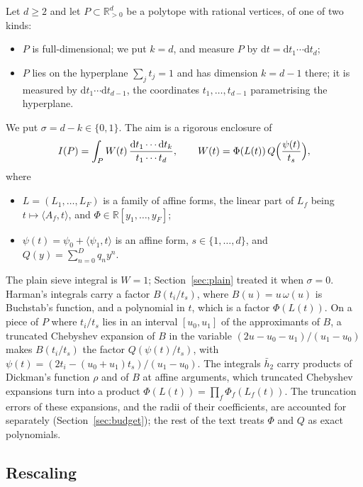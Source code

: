 \documentclass[11pt]{article}
\theoremstyle{remark}
\newcommand{\R}{\mathbb{R}}
\newcommand{\scal}[2]{\langle #1, #2\rangle}
\newcommand{\dd}{\mathrm{d}}
\begin{document}
Let $d \geq 2$ and let $P \subset \R_{>0}^d$ be a polytope with rational
vertices, of one of two kinds:
\begin{itemize}
\item $P$ is full-dimensional; we put $k = d$, and measure $P$ by
  $\dd t = \dd t_1 \cdots \dd t_d$;
\item $P$ lies on the hyperplane $\sum_j t_j = 1$ and has dimension
  $k = d - 1$ there; it is measured by $\dd t_1 \cdots \dd t_{d-1}$, the
  coordinates $t_1, \ldots, t_{d-1}$ parametrising the hyperplane.
\end{itemize}
We put $\sigma = d - k \in \{0, 1\}$. The aim is a rigorous enclosure of
\begin{equation}\label{eq:integral}
  I(P) = \int_P W(t) \, \frac{\dd t_1 \cdots \dd t_k}{t_1 \cdots t_d},
  \qquad
  W(t) = \Phi(L(t)) \, Q\Bigl(\frac{\psi(t)}{t_s}\Bigr),
\end{equation}
where
\begin{itemize}
\item $L = (L_1, \ldots, L_F)$ is a family of affine forms, the linear part
  of $L_f$ being $t \mapsto \scal{A_f}{t}$, and $\Phi \in \R[y_1, \ldots,
  y_F]$;
\item $\psi(t) = \psi_0 + \scal{\psi_1}{t}$ is an affine form,
  $s \in \{1, \ldots, d\}$, and $Q(y) = \sum_{n=0}^{D} q_n y^n$.
\end{itemize}
The plain sieve integral is $W = 1$; Section~\ref{sec:plain} treated it when
$\sigma = 0$. Harman's integrals carry a factor $B(t_i/t_s)$, where $B(u) =
u\,\omega(u)$ is Buchstab's function, and a polynomial in $t$, which is a
factor $\Phi(L(t))$. On a piece of $P$ where $t_i/t_s$ lies in an interval
$[u_0, u_1]$ of the approximants of $B$, a truncated Chebyshev expansion of
$B$ in the variable $(2u - u_0 - u_1)/(u_1 - u_0)$ makes $B(t_i/t_s)$ the
factor $Q(\psi(t)/t_s)$, with $\psi(t) = (2 t_i - (u_0 + u_1) t_s)/(u_1 -
u_0)$. The integrals $\bar h_2$ carry products of Dickman's function $\rho$
and of $B$ at affine arguments, which truncated Chebyshev expansions turn
into a product $\Phi(L(t)) = \prod_f \Phi_f(L_f(t))$. The truncation errors
of these expansions, and the radii of their coefficients, are accounted for
separately (Section~\ref{sec:budget}); the rest of the text treats $\Phi$
and $Q$ as exact polynomials.

\subsection{Rescaling}
\end{document}
